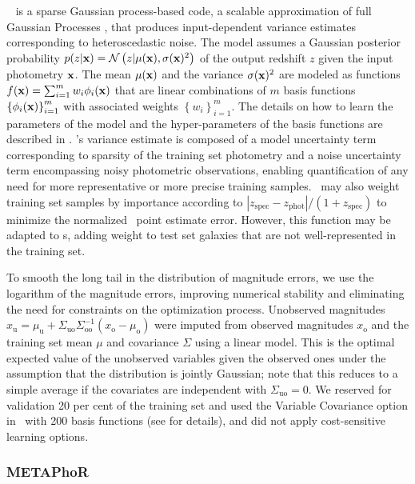 \gpz\ \citep{Almosallam:16a,Almosallam:15b} is a sparse Gaussian process-based code, a scalable approximation of full Gaussian Processes \citep{Rasmussen:06}, that produces input-dependent variance estimates corresponding to heteroscedastic noise.
The model assumes a Gaussian posterior probability $p(z \vert {\mathbf{x}}) = \mathcal{N}\left(z \vert \mu({\mathbf{x}}), \sigma({\mathbf{x}})^{2}\right)$ of the output redshift $z$ given the input photometry ${\mathbf{x}}$.
The mean $\mu({\mathbf{x}})$ and the variance $\sigma({\mathbf{x}})^{2}$ are modeled as functions $f({\mathbf{x}}) = \sum_{i=1}^{m}w_{i}\phi_{i}({\mathbf{x}})$ that are linear combinations of $m$ basis functions $\left\{\phi_{i}({\mathbf{x}})\right\}_{i=1}^{m}$ with associated weights $\left\{w_{i}\right\}_{i=1}^{m}$.
The details on how to learn the parameters of the model and the hyper-parameters of the basis functions are described in \citet{Almosallam:15b}.
\gpz's variance estimate is composed of a model uncertainty term corresponding to sparsity of the training set photometry and a noise uncertainty term encompassing noisy photometric observations, enabling quantification of any need for more representative or more precise training samples.
\gpz\ may also weight training set samples by importance according to $|z_{\mathrm{spec}} - z_{\mathrm{phot}}| / (1+z_{\mathrm{spec}})$ to minimize the normalized \pz\ point estimate error.  However, this function may be adapted to \pzpdf s, adding weight to test set galaxies that are not well-represented in the training set.

To smooth the long tail in the distribution of magnitude errors, we use the logarithm of the magnitude errors, improving numerical stability and eliminating the need for constraints on the optimization process.
Unobserved magnitudes $x_{\mathrm{u}} = \mu_{\mathrm{u}} + \Sigma_{\mathrm{uo}}\Sigma_{\mathrm{oo}}^{-1}(x_{\mathrm{o}} - \mu_{\mathrm{o}})$ were imputed from observed magnitudes $x_{\mathrm{o}}$ and the training set mean $\mu$ and covariance $\Sigma$ using a linear model.
This is the optimal expected value of the unobserved variables given the observed ones under the assumption that the distribution is jointly Gaussian; note that this reduces to a simple average if the covariates are independent with $\Sigma_{\mathrm{uo}} = 0$.
We reserved for validation 20 per cent of the training set and used the Variable Covariance option in \gpz\ with 200 basis functions (see \citet{Almosallam:15b} for details), and did not apply cost-sensitive learning options.

\subsubsection{METAPhoR}
\label{sec:metaphor}

